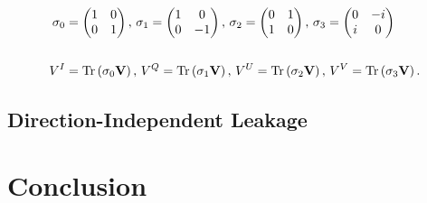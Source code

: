 \begin{equation}
\begin{split}
\sigma_0 &=\begin{pmatrix}1 & 0 \\0 & 1 \\ \end{pmatrix},\,
\sigma_1 = \begin{pmatrix} 1 & 0 \\ 0 & -1 \\ \end{pmatrix},\,
\sigma_2 = \begin{pmatrix} 0 & 1 \\ 1 & 0 \\ \end{pmatrix},\,
\sigma_3 = \begin{pmatrix} 0 & -i \\ i & 0 \\ \end{pmatrix} \\\\
V^I &= {\rm Tr}\left( \sigma_0\textbf{V} \right),\, V^Q= {\rm Tr}\left( \sigma_1\textbf{V} \right),\, V^U = {\rm Tr}\left( \sigma_2\textbf{V} \right),\, V^V = {\rm Tr}\left( \sigma_3\textbf{V} \right).
\end{split}
\end{equation}

\subsection{Direction-Independent Leakage}

\section{Conclusion}
